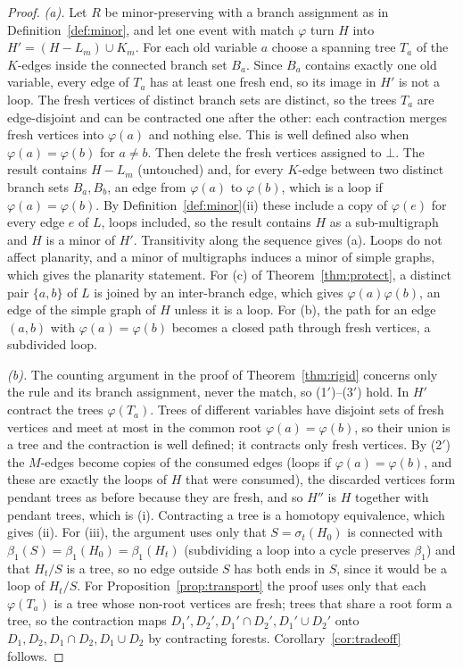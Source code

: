 \documentclass[10pt]{article}
\theoremstyle{definition}
\theoremstyle{plain}
\theoremstyle{remark}
\newcommand{\Betti}{\beta_1}
\begin{document}
\begin{proof}
\emph{(a).} Let $R$ be minor-preserving with a branch assignment as in Definition~\ref{def:minor}, and let one event with match $\varphi$ turn $H$ into $H'=(H-L_m)\cup K_m$. For each old variable $a$ choose a spanning tree $T_a$ of the $K$-edges inside the connected branch set $B_a$. Since $B_a$ contains exactly one old variable, every edge of $T_a$ has at least one fresh end, so its image in $H'$ is not a loop. The fresh vertices of distinct branch sets are distinct, so the trees $T_a$ are edge-disjoint and can be contracted one after the other: each contraction merges fresh vertices into $\varphi(a)$ and nothing else. This is well defined also when $\varphi(a)=\varphi(b)$ for $a\neq b$. Then delete the fresh vertices assigned to $\bot$. The result contains $H-L_m$ (untouched) and, for every $K$-edge between two distinct branch sets $B_a,B_b$, an edge from $\varphi(a)$ to $\varphi(b)$, which is a loop if $\varphi(a)=\varphi(b)$. By Definition~\ref{def:minor}(ii) these include a copy of $\varphi(e)$ for every edge $e$ of $L$, loops included, so the result contains $H$ as a sub-multigraph and $H$ is a minor of $H'$. Transitivity along the sequence gives (a). Loops do not affect planarity, and a minor of multigraphs induces a minor of simple graphs, which gives the planarity statement. For (c) of Theorem~\ref{thm:protect}, a distinct pair $\{a,b\}$ of $L$ is joined by an inter-branch edge, which gives $\varphi(a)\varphi(b)$, an edge of the simple graph of $H$ unless it is a loop. For (b), the path for an edge $(a,b)$ with $\varphi(a)=\varphi(b)$ becomes a closed path through fresh vertices, a subdivided loop.

\emph{(b).} The counting argument in the proof of Theorem~\ref{thm:rigid} concerns only the rule and its branch assignment, never the match, so (1$'$)--(3$'$) hold. In $H'$ contract the trees $\varphi(T_a)$. Trees of different variables have disjoint sets of fresh vertices and meet at most in the common root $\varphi(a)=\varphi(b)$, so their union is a tree and the contraction is well defined; it contracts only fresh vertices. By (2$'$) the $M$-edges become copies of the consumed edges (loops if $\varphi(a)=\varphi(b)$, and these are exactly the loops of $H$ that were consumed), the discarded vertices form pendant trees as before because they are fresh, and so $H''$ is $H$ together with pendant trees, which is (i). Contracting a tree is a homotopy equivalence, which gives (ii). For (iii), the argument uses only that $S=\sigma_t(H_0)$ is connected with $\Betti(S)=\Betti(H_0)=\Betti(H_t)$ (subdividing a loop into a cycle preserves $\Betti$) and that $H_t/S$ is a tree, so no edge outside $S$ has both ends in $S$, since it would be a loop of $H_t/S$. For Proposition~\ref{prop:transport} the proof uses only that each $\varphi(T_a)$ is a tree whose non-root vertices are fresh; trees that share a root form a tree, so the contraction maps $D_1',D_2',D_1'\cap D_2',D_1'\cup D_2'$ onto $D_1,D_2,D_1\cap D_2,D_1\cup D_2$ by contracting forests. Corollary~\ref{cor:tradeoff} follows.


\end{proof}
\end{document}
